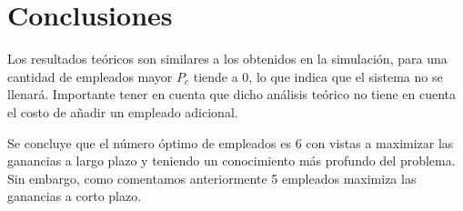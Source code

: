 \documentclass{article}
\begin{document}
\section{Conclusiones}
Los resultados teóricos son similares a los obtenidos en la simulación, para una cantidad de empleados mayor $P_c$ tiende a 0, lo que indica que el sistema no se llenará. 
Importante tener en cuenta que dicho análisis teórico no tiene en cuenta el costo de añadir un empleado adicional.

Se concluye que el número óptimo de empleados es 6 con vistas a maximizar las ganancias a largo plazo y teniendo un conocimiento más profundo del problema. 
Sin embargo, como comentamos anteriormente 5 empleados maximiza las ganancias a corto plazo. 
\end{document}
